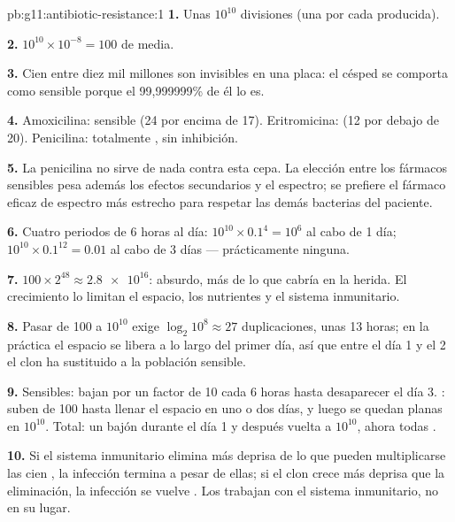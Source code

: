 \begin{solution}{pb:g11:antibiotic-resistance:1}
\textbf{1.} Unas $10^{10}$ divisiones (una por cada  producida).

\textbf{2.} $10^{10} \times 10^{-8} = 100$   de
media.

\textbf{3.} Cien  entre diez mil millones son invisibles en una
placa: el césped se comporta como sensible porque el 99,999999\% de él
lo es.

\textbf{4.} Amoxicilina: sensible (24 por encima de 17). Eritromicina:
 (12 por debajo de 20). Penicilina: totalmente ,
sin inhibición.

\textbf{5.} La penicilina no sirve de nada contra esta cepa. La
elección entre los fármacos sensibles pesa además los efectos
secundarios y el espectro; se prefiere el fármaco eficaz de espectro
más estrecho para respetar las demás bacterias del paciente.

\textbf{6.} Cuatro periodos de 6 horas al día: $10^{10} \times 0.1^4 =
10^6$ al cabo de 1 día; $10^{10} \times 0.1^{12} = 0.01$ al cabo de 3
días --- prácticamente ninguna.

\textbf{7.} $100 \times 2^{48} \approx \num{2.8e16}$: absurdo, más de
lo que cabría en la herida. El crecimiento lo limitan el espacio, los
nutrientes y el sistema inmunitario.

\textbf{8.} Pasar de 100  a $10^{10}$ exige $\log_2 10^8 \approx 27$ duplicaciones, unas 13 horas; en la práctica el espacio se libera a
lo largo del primer día, así que entre el día 1 y el 2 el clon
 ha sustituido a la población sensible.

\textbf{9.} Sensibles: bajan por un factor de 10 cada 6 horas hasta
desaparecer el día 3. : suben de 100 hasta llenar el espacio
en uno o dos días, y luego se quedan planas en $10^{10}$. Total: un
bajón durante el día 1 y después vuelta a $10^{10}$, ahora todas
.

\textbf{10.} Si el sistema inmunitario elimina  más deprisa de
lo que pueden multiplicarse las cien , la infección termina
a pesar de ellas; si el clon crece más deprisa que la eliminación, la
infección se vuelve . Los  trabajan con el
sistema inmunitario, no en su lugar.


\end{solution}
